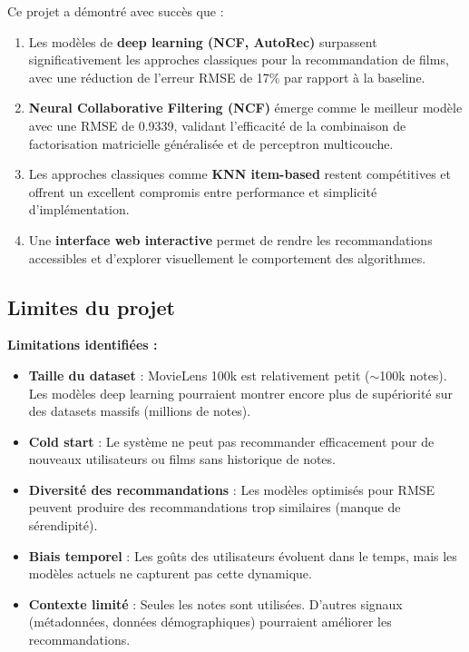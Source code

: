 \documentclass[12pt,a4paper]{article}
\begin{document}
Ce projet a démontré avec succès que :

\begin{enumerate}
    \item Les modèles de \textbf{deep learning (NCF, AutoRec)} surpassent significativement les approches classiques pour la recommandation de films, avec une réduction de l'erreur RMSE de 17\% par rapport à la baseline.
    
    \item \textbf{Neural Collaborative Filtering (NCF)} émerge comme le meilleur modèle avec une RMSE de 0.9339, validant l'efficacité de la combinaison de factorisation matricielle généralisée et de perceptron multicouche.
    
    \item Les approches classiques comme \textbf{KNN item-based} restent compétitives et offrent un excellent compromis entre performance et simplicité d'implémentation.
    
    \item Une \textbf{interface web interactive} permet de rendre les recommandations accessibles et d'explorer visuellement le comportement des algorithmes.
\end{enumerate}

\subsection{Limites du projet}

\textbf{Limitations identifiées :}

\begin{itemize}
    \item \textbf{Taille du dataset} : MovieLens 100k est relativement petit ($\sim$100k notes). Les modèles deep learning pourraient montrer encore plus de supériorité sur des datasets massifs (millions de notes).
    
    \item \textbf{Cold start} : Le système ne peut pas recommander efficacement pour de nouveaux utilisateurs ou films sans historique de notes.
    
    \item \textbf{Diversité des recommandations} : Les modèles optimisés pour RMSE peuvent produire des recommandations trop similaires (manque de sérendipité).
    
    \item \textbf{Biais temporel} : Les goûts des utilisateurs évoluent dans le temps, mais les modèles actuels ne capturent pas cette dynamique.
    
    \item \textbf{Contexte limité} : Seules les notes sont utilisées. D'autres signaux (métadonnées, données démographiques) pourraient améliorer les recommandations.
\end{itemize}
\end{document}
